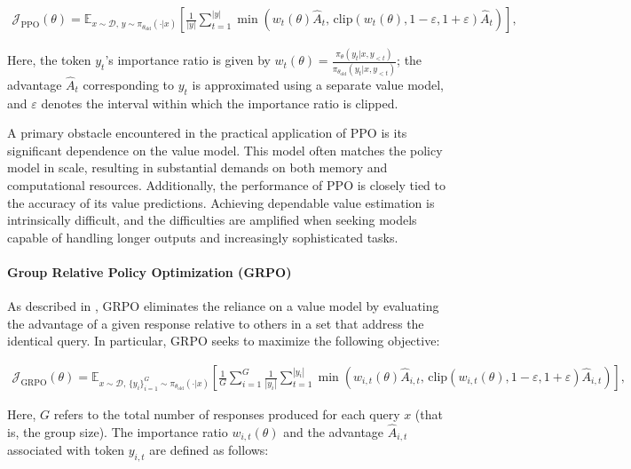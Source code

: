 \begin{align}
\mathcal{J}_\text{PPO}(\theta) = \mathbb{E}_{ x \sim \mathcal{D},\, y \sim \pi_{\theta_\text{old}}( \cdot | x) }
\left[ \frac{1}{|y|} \sum_{t=1}^{|y|} 
\min \left( w_{t}(\theta) \widehat{A}_{t},  \, \mathrm{clip} \left( w_{t}(\theta), 1 - {\varepsilon}, 1 + {\varepsilon}\right) \widehat{A}_{t} \right)
\right],
\end{align}

Here, the token $y_t$'s importance ratio is given by $w_{t}(\theta) = \frac{ \pi_{\theta} (y_{t} | x, y_{<t}) }{ \pi_{\theta_\text{old}} (y_{t} | x,y_{<t})}$; the advantage $\widehat{A}_{t}$ corresponding to $y_t$ is approximated using a separate value model, and $\varepsilon$ denotes the interval within which the importance ratio is clipped.

A primary obstacle encountered in the practical application of PPO is its significant dependence on the value model. This model often matches the policy model in scale, resulting in substantial demands on both memory and computational resources. Additionally, the performance of PPO is closely tied to the accuracy of its value predictions. Achieving dependable value estimation is intrinsically difficult, and the difficulties are amplified when seeking models capable of handling longer outputs and increasingly sophisticated tasks.

\paragraph{Group Relative Policy Optimization (GRPO)} As described in \citep{grpo}, GRPO eliminates the reliance on a value model by evaluating the advantage of a given response relative to others in a set that address the identical query. In particular, GRPO seeks to maximize the following objective:

\begin{align}
\label{equ:grpo}
\mathcal{J}_\text{GRPO}(\theta) = \mathbb{E}_{ x \sim \mathcal{D},\, \{y_i\}_{i=1}^G \sim \pi_{\theta_\text{old}}( \cdot | x) }
\left[ \frac{1}{G} \sum_{i=1}^{G} \frac{1}{|y_i|} \sum_{t=1}^{|y_i|} 
\min \left( w_{i,t}(\theta) \widehat{A}_{i,t},  \, \mathrm{clip} \left( w_{i,t}(\theta), 1 - {\varepsilon}, 1 + {\varepsilon}\right) \widehat{A}_{i,t} \right)
\right],
\end{align}

Here, $G$ refers to the total number of responses produced for each query $x$ (that is, the group size). The importance ratio $w_{i,t}(\theta)$ and the advantage $\widehat{A}_{i,t}$ associated with token $y_{i,t}$ are defined as follows:

